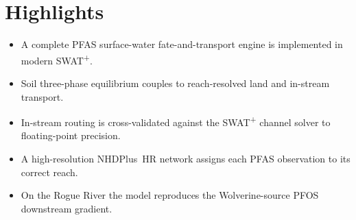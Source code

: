 \section*{Highlights}
\begin{itemize}\itemsep0pt
  \item A complete PFAS surface-water fate-and-transport engine is implemented in modern SWAT\textsuperscript{+}.
  \item Soil three-phase equilibrium couples to reach-resolved land and in-stream transport.
  \item In-stream routing is cross-validated against the SWAT\textsuperscript{+} channel solver to floating-point precision.
  \item A high-resolution NHDPlus~HR network assigns each PFAS observation to its correct reach.
  \item On the Rogue River the model reproduces the Wolverine-source PFOS downstream gradient.
\end{itemize}
